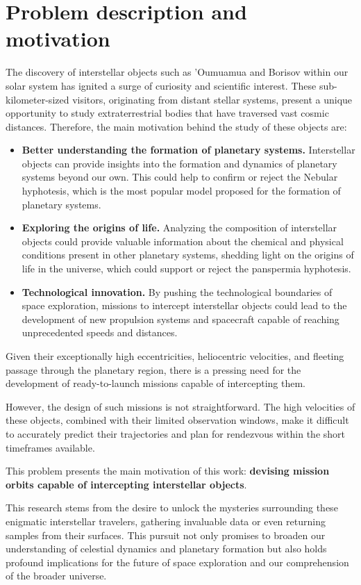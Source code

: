 \section{Problem description and motivation}

The discovery of interstellar objects such as 'Oumuamua and Borisov within our
solar system has ignited a surge of curiosity and scientific interest. These
sub-kilometer-sized visitors, originating from distant stellar systems, present
a unique opportunity to study extraterrestrial bodies that have traversed vast
cosmic distances. Therefore, the main motivation behind the study of these
objects are:

\begin{itemize}

  \item \textbf{Better understanding the formation of planetary systems.}
        Interstellar objects can provide insights into the formation and
        dynamics of planetary systems beyond our own. This could help to
        confirm or reject the Nebular hyphotesis, which is the most popular
        model proposed for the formation of planetary systems.

  \item \textbf{Exploring the origins of life.} Analyzing the composition of
        interstellar objects could provide valuable information about the
        chemical and physical conditions present in other planetary
        systems, shedding light on the origins of life in the universe, which
        could support or reject the panspermia hyphotesis.

  \item \textbf{Technological innovation.} By pushing the technological
        boundaries of space exploration, missions to intercept interstellar
        objects could lead to the development of new propulsion systems and
        spacecraft capable of reaching unprecedented speeds and distances.

\end{itemize}

Given their exceptionally high eccentricities, heliocentric velocities, and
fleeting passage through the planetary region, there is a pressing need for the
development of ready-to-launch missions capable of intercepting them.

However, the design of such missions is not straightforward. The high velocities
of these objects, combined with their limited observation windows, make it
difficult to accurately predict their trajectories and plan for rendezvous
within the short timeframes available.

This problem presents the main motivation of this work: \textbf{devising mission
  orbits capable of intercepting interstellar objects}.

This research stems from the desire to unlock the mysteries surrounding these
enigmatic interstellar travelers, gathering invaluable data or even returning
samples from their surfaces. This pursuit not only promises to broaden our
understanding of celestial dynamics and planetary formation but also holds
profound implications for the future of space exploration and our comprehension
of the broader universe.

